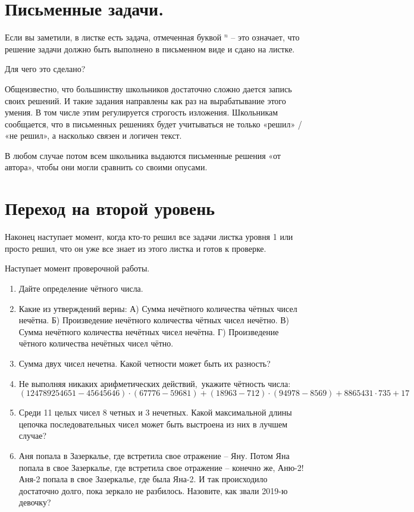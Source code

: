\section{Письменные задачи.}
Если вы заметили, в листке есть задача, отмеченная буквой ${}^{n}$ -- это означает, что решение задачи должно быть выполнено в письменном виде и сдано на листке.

Для чего это сделано?

Общеизвестно, что большинству школьников достаточно сложно дается запись своих решений. И такие задания направлены как раз на вырабатывание этого умения. В том числе этим регулируется строгость изложения. Школьникам сообщается, что в письменных решениях будет учитываться не только «решил» / «не решил», а насколько связен и логичен текст. 

В любом случае потом всем школьника выдаются письменные решения «от автора», чтобы они могли сравнить со своими опусами.


\section{Переход на второй уровень}

Наконец наступает момент, когда кто-то решил все задачи листка уровня 1 или просто решил, что он уже все знает из этого листка и готов к проверке.

Наступает момент проверочной работы.


\begin{enumerate}
	\item Дайте определение чётного числа.
	
	\item Какие из утверждений верны: А) Сумма нечётного количества чётных чисел нечётна. Б) Произведение нечётного количества чётных чисел нечётно. В) Сумма нечётного количества нечётных чисел нечётна. Г) Произведение чётного количества нечётных чисел чётно.
	
	\item Сумма двух чисел нечетна. Какой четности может быть их разность?
	
	\item Не выполняя никаких арифметических действий,~укажите чётность числа: 
	\[(124789254651-45645646)\cdot(67776-59681)+(18963-712)\cdot(94978-8569)+8865431\cdot735+17\] 
	\item Среди 11 целых чисел 8 четных и 3 нечетных. Какой максимальной длины цепочка последовательных чисел может быть выстроена из них в лучшем случае? 
	\item  Аня попала в Зазеркалье, где встретила свое отражение -- Яну. Потом Яна попала в свое Зазеркалье, где встретила свое отражение -- конечно же, Аню-2! Аня-2 попала в свое Зазеркалье, где была Яна-2. И так происходило достаточно долго, пока зеркало не разбилось. Назовите, как звали 2019-ю девочку?
\end{enumerate}
\hrulefill

